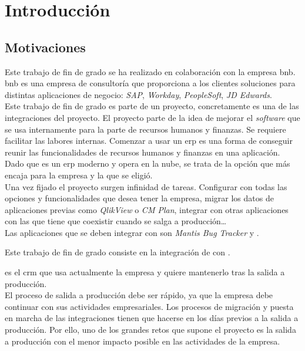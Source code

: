 \chapter{Introducción}


\section{Motivaciones}
Este trabajo de fin de grado se ha realizado en colaboración con la empresa \acrfull{bnb}.
\acrshort{bnb} es una empresa de consultoría que proporciona a los clientes soluciones para distintas aplicaciones de negocio: \textit{SAP}, \textit{Workday}, \textit{PeopleSoft}, \textit{JD Edwards}.\\

Este trabajo de fin de grado es parte de un proyecto, concretamente es una de las integraciones del proyecto.
El proyecto parte de la idea de mejorar el \textit{software} que se usa internamente para la parte de recursos humanos y finanzas. Se requiere facilitar las labores internas.
Comenzar a usar un \acrshort{erp} es una forma de conseguir reunir las funcionalidades de recursos humanos y finanzas en una aplicación.
Dado que \wday{} es un \acrshort{erp} moderno y opera en la nube, se trata de la opción que más encaja para la empresa y la que se eligió.
\\

Una vez fijado el proyecto surgen infinidad de tareas. Configurar \wday{} con todas las opciones y funcionalidades que desea tener la empresa, migrar los datos de aplicaciones previas como \textit{QlikView} o \textit{CM Plan}, 
integrar \wday{} con otras aplicaciones con las que tiene que coexistir cuando se salga a producción\ldots\\

Las aplicaciones que se deben integrar con \wday{} son \textit{Mantis Bug Tracker} y \hs{}.

Este trabajo de fin de grado consiste en la integración de \wday{} con \hs{}.

\hs{} es el \acrshort{crm} que usa actualmente la empresa y quiere mantenerlo tras la salida a producción.\\


El proceso de salida a producción debe ser rápido, ya que la empresa debe continuar con sus actividades empresariales. 
Los procesos de migración y puesta en marcha de las integraciones tienen que hacerse en los días previos a la salida a producción.
Por ello, uno de los grandes retos que supone el proyecto es la salida a producción con el menor impacto posible en las actividades de la empresa.\\




